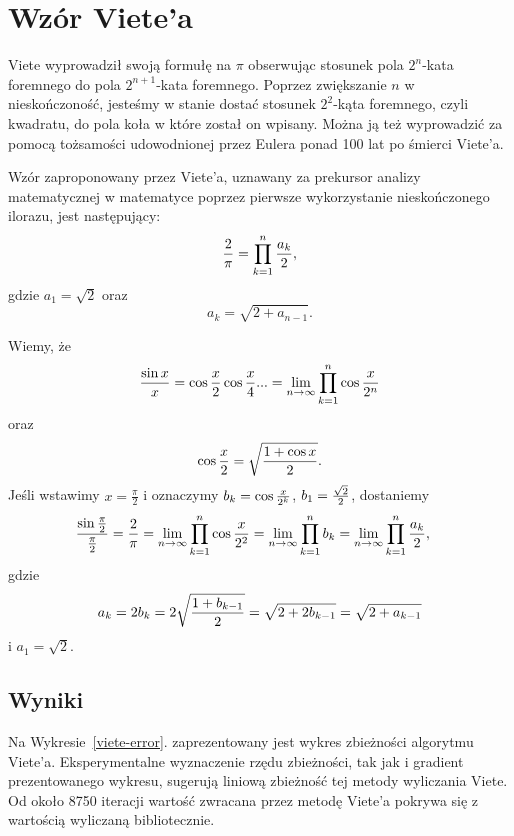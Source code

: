 \section{Wzór Viete'a}


Viete wyprowadził swoją formułę na $\pi$ obserwując stosunek pola $2^n$-kata foremnego do pola $2^{n+1}$-kata foremnego. Poprzez zwiększanie $n$ w nieskończoność, jesteśmy w stanie dostać stosunek $2^2$-kąta foremnego, czyli kwadratu, do pola koła w które został on wpisany. Można ją też wyprowadzić za pomocą tożsamości udowodnionej przez Eulera ponad 100 lat po śmierci Viete'a.

Wzór zaproponowany przez Viete'a, uznawany za prekursor analizy matematycznej w matematyce poprzez pierwsze wykorzystanie nieskończonego ilorazu, jest następujący:
\begin{equation}
    {2\over\pi}=\prod\limits_{k=1}^n{a_k\over2},
\end{equation}
gdzie $a_1=\sqrt2$ oraz
$$a_k=\sqrt{2+a_{n-1}}.$$

Wiemy, że
$${\sin x\over x}=\cos\frac x2\cos\frac x4...=\lim_{n\to\infty}\prod\limits_{k=1}^n\cos{x\over 2^n}$$
oraz
$$\cos\frac x2=\sqrt{{1+\cos x\over 2}}.$$
Jeśli wstawimy $x=\frac\pi2$ i oznaczymy $b_k=\cos{x\over 2^k}$, $b_1={\sqrt2\over2}$,  dostaniemy
\begin{align*}
    {\sin\frac\pi2\over\frac\pi2}&=\frac2\pi=\lim_{n\to\infty}\prod\limits_{k=1}^n\cos{x\over 2^2}=\lim_{n\to\infty}\prod\limits_{k=1}^nb_k=\lim_{n\to\infty}\prod\limits_{k=1}^n{a_k\over 2},
\end{align*}
gdzie 
$$a_k=2b_k=2\sqrt{{1+b_{k-1}\over 2}}=\sqrt{2+2b_{k-1}}=\sqrt{2+a_{k-1}}$$
i $a_1=\sqrt2$.

\subsection{Wyniki}

Na Wykresie~\ref{viete-error}. zaprezentowany jest wykres zbieżności algorytmu Viete'a. Eksperymentalne wyznaczenie rzędu zbieżności, tak jak i gradient prezentowanego wykresu, sugerują liniową zbieżność tej metody wyliczania Viete. Od około 8750 iteracji wartość zwracana przez metodę Viete'a pokrywa się z wartością wyliczaną bibliotecznie.

